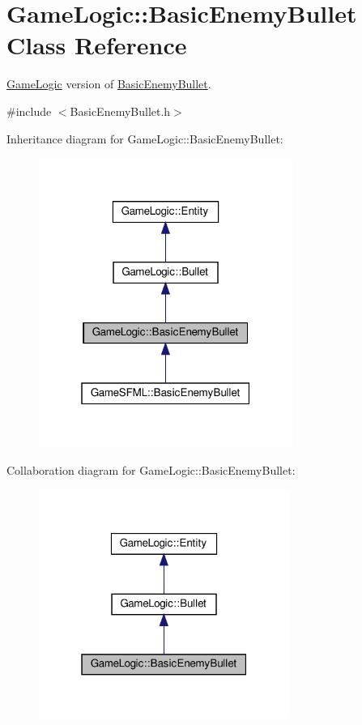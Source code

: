\hypertarget{classGameLogic_1_1BasicEnemyBullet}{}\section{Game\+Logic\+:\+:Basic\+Enemy\+Bullet Class Reference}
\label{classGameLogic_1_1BasicEnemyBullet}


\hyperlink{namespaceGameLogic}{Game\+Logic} version of \hyperlink{classGameLogic_1_1BasicEnemyBullet}{Basic\+Enemy\+Bullet}.  




{\ttfamily \#include $<$Basic\+Enemy\+Bullet.\+h$>$}



Inheritance diagram for Game\+Logic\+:\+:Basic\+Enemy\+Bullet\+:
\nopagebreak
\begin{figure}[H]
\begin{center}
\leavevmode
\includegraphics[width=235pt]{classGameLogic_1_1BasicEnemyBullet__inherit__graph}
\end{center}
\end{figure}


Collaboration diagram for Game\+Logic\+:\+:Basic\+Enemy\+Bullet\+:
\nopagebreak
\begin{figure}[H]
\begin{center}
\leavevmode
\includegraphics[width=232pt]{classGameLogic_1_1BasicEnemyBullet__coll__graph}
\end{center}
\end{figure}
